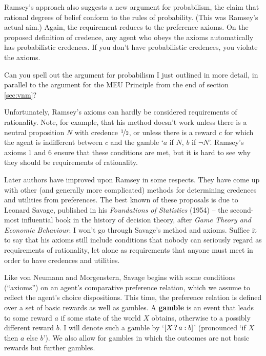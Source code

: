 Ramsey's approach also suggests a new argument for probabilism, the claim that
rational degrees of belief conform to the rules of probability. (This was
Ramsey's actual aim.) Again, the requirement reduces to the preference axioms.
On the proposed definition of credence, any agent who obeys the axioms
automatically has probabilistic credences. If you don't have probabilistic
credences, you violate the axioms.

\begin{exercise}{2}
  Can you spell out the argument for probabilism I just outlined in more detail,
  in parallel to the argument for the MEU Principle from the end of section
  \ref{sec:vnm}?
\end{exercise}

Unfortunately, Ramsey's axioms can hardly be considered requirements of
rationality. Note, for example, that his method doesn't work unless there is a
neutral proposition $N$ with credence $\nicefrac{1}{2}$, or unless there is a
reward $c$ for which the agent is indifferent between $c$ and the gamble `$a$ if
$N$, $b$ if $\neg N$'. Ramsey's axioms 1 and 6 ensure that these conditions are
met, but it is hard to see why they should be requirements of rationality.

Later authors have improved upon Ramsey in some respects. They have come up with
other (and generally more complicated) methods for determining credences and
utilities from preferences. The best known of these proposals is due to Leonard
Savage, published in his \emph{Foundations of Statistics} (1954) -- the
second-most influential book in the history of decision theory, after \emph{Game
  Theory and Economic Behaviour}. I won't go through Savage's method and axioms.
Suffice it to say that his axioms still include conditions that nobody can
seriously regard as requirements of rationality, let alone as requirements that
anyone must meet in order to have credences and utilities.

\iffalse

Like von Neumann and Morgenstern, Savage begins with some conditions
(``axioms'') on an agent's comparative preference relation, which we assume to
reflect the agent's choice dispositions. This time, the preference relation is
defined over a set of basic rewards as well as gambles. A \textbf{gamble} is an
event that leads to some reward $a$ if some state of the world $X$ obtains,
otherwise to a possibly different reward $b$. I will denote such a gamble by
`$[X\,?\, a :b]$' (pronounced `if $X$ then $a$ else $b$'). We also allow for
gambles in which the outcomes are not basic rewards but further gambles.

